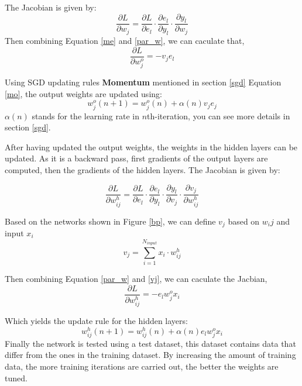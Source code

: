     The Jacobian is given by:
    \begin{equation}
        \frac{\partial L}{\partial w_{j}} = \frac{\partial L}{\partial e_l} \cdot \frac{\partial e_l}{\partial y_l} \cdot \frac{\partial y_l}{\partial w_{j}}
        \label{par_w}
    \end{equation}
    Then combining Equation \ref{me} and \ref{par_w}, we can caculate that,
    \begin{equation}
        \frac{\partial L}{\partial w^{o}_{j}} = -v_j e_l
    \end{equation}

    Using SGD updating rules \textbf{Momentum} mentioned in section \ref{sgd} Equation \ref{mo}, the output weights are updated using:
    \begin{equation}
        w^{o}_{j}(n+1) = w^{o}_{j}(n) + \alpha(n)v_j e_j
    \end{equation}
    $\alpha(n)$ stands for the learning rate in $n$th-iteration, you can see more details in section \ref{sgd}.

    After having updated the output weights, the weights in the hidden layers can be updated. As it is a backward pass, first gradients of the output layers are computed, then the gradients of the hidden layers. The Jacobian is given by:

    \begin{equation}
        \frac{\partial L}{\partial w^{h}_{ij}} = \frac{\partial L}{\partial e_l} \cdot \frac{\partial e_l}{\partial y_l} \cdot \frac{\partial y_l}{\partial v_{j}} \cdot \frac{\partial v_j}{\partial w^{h}_{ij}}
        \label{par_w}
    \end{equation}

    Based on the networks shown in Figure \ref{bp}, we can define $v_j$ based on $w_ij$ and input $x_i$
    \begin{equation}
        v_j = \sum_{i=1}^{N_{input}}x_i\cdot w^{h}_{ij}
        \label{vj}
    \end{equation}


    Then combining Equation \ref{par_w} and \ref{vj}, we can caculate the Jacbian,
    \begin{equation}
        \frac{\partial L}{\partial w_{ij}^{h}} = -e_l w_j^{o} x_i
    \end{equation} 

    Which yields the update rule for the hidden layers:
    \begin{equation}
        w_{ij}^{h}(n+1) = w_{ij}^{h}(n)+ \alpha(n)e_l w_j^{o} x_i
    \end{equation}
    Finally the network is tested using a test dataset, this dataset contains data that differ from the ones in the training dataset. By increasing the amount of training data, the more training iterations are carried out, the better the weights are tuned.


